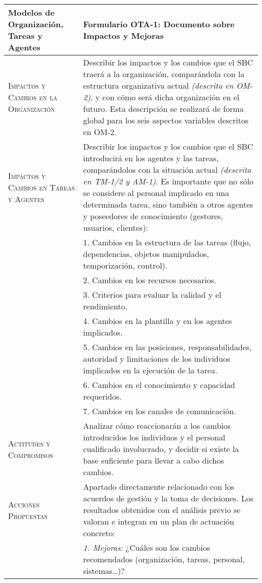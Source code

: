 \documentclass[12pt,a4paper,twoside,spanish]{article}      %
\begin{document}
\begin{table}[H]
\scriptsize
\begin{tabularx}{\textwidth}{|p{4cm}|X|} \hline
\textbf{Modelos de Organización, Tareas y Agentes} &
\textbf{Formulario OTA-1: Documento sobre Impactos y Mejoras}\\
\hline\hline \textsc{Impactos y Cambios en la Organización} &
Describir los impactos y los cambios que el SBC traerá a la
organización, comparándola con la estructura organizativa actual
\emph{(descrita en OM-2)}, y con cómo será dicha organización en
el futuro. Esta descripción se realizará de forma global para los
seis aspectos variables descritos en OM-2.
 \\ \hline
\textsc{Impactos y Cambios en Tareas y Agentes} & Describir los
impactos y los cambios que el SBC introducirá en los agentes y las
tareas, comparándolos con la situación actual \emph{(descrita en
TM-1/2 y AM-1)}. Es importante que no sólo se considere al
personal implicado en una determinada tarea, sino también a otros
agentes y poseedores de conocimiento (gestores, usuarios,
clientes): \\
& 1. Cambios en la estructura de las tareas (flujo, dependencias,
objetos manipulados, temporización, control). \\
& 2. Cambios en los recursos necesarios. \\
& 3. Criterios para evaluar la calidad y el rendimiento.\\
& 4. Cambios en la plantilla y en los agentes implicados.\\
& 5. Cambios en las posiciones, responsabilidades, autoridad y limitaciones de los
individuos implicados en la ejecución de la tarea.\\
& 6. Cambios en el conocimiento y capacidad requeridos.\\
& 7. Cambios en los canales de comunicación.\\
\hline
\textsc{Actitudes y Compromisos} &  Analizar cómo reaccionarán a
los cambios introducidos los individuos y el personal cualificado
involucrado, y decidir si existe la base suficiente para llevar a
cabo dichos cambios.
 \\ \hline
\textsc{Acciones Propuestas} &  Apartado directamente relacionado
con los acuerdos de gestión y la toma de decisiones. Los
resultados obtenidos con el análisis previo se valoran e integran
en un plan de actuación concreto: \\
& \textit{1. Mejoras:} ¿Cuáles son los cambios recomendados (organización, tareas, personal, sistemas\ldots)?\\

\end{tabularx}
\end{table}
\end{document}
